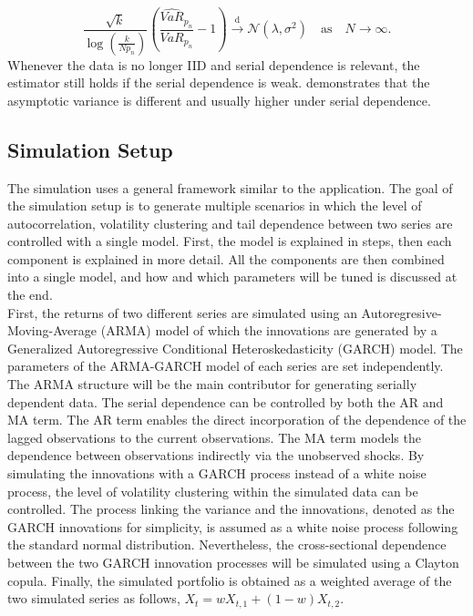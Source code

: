 \documentclass[a4paper,12pt]{article}
\theoremstyle{plain}
\begin{document}
\begin{equation}
    \frac{\sqrt{k}}{\log{\left(\frac{k}{Np_n}\right)}}\left(\frac{\widehat{VaR}_{p_n}}{VaR_{p_n}}-1\right)\xrightarrow{\text{d}}\mathcal{N}\left(\lambda, \sigma^2\right) \quad \text{as} \quad N\rightarrow\infty.
\end{equation}
Whenever the data is no longer IID and serial dependence is relevant, the estimator still holds if the serial dependence is weak.  demonstrates that the asymptotic variance is different and usually higher under serial dependence. 

\subsection{Simulation Setup}
The simulation uses a general framework similar to the application. The goal of the simulation setup is to generate multiple scenarios in which the level of autocorrelation, volatility clustering and tail dependence between two series are controlled with a single model. First, the model is explained in steps, then each component is explained in more detail. All the components are then combined into a single model, and how and which parameters will be tuned is discussed at the end.\\

First, the returns of two different series are simulated using an Autoregresive-Moving-Average (ARMA) model of which the innovations are generated by a Generalized Autoregressive Conditional Heteroskedasticity (GARCH) model. The parameters of the ARMA-GARCH model of each series are set independently. The ARMA structure will be the main contributor for generating serially dependent data. The serial dependence can be controlled by both the AR and MA term. The AR term enables the direct incorporation of the dependence of the lagged observations to the current observations. The MA term models the dependence between observations indirectly via the unobserved shocks. By simulating the innovations with a GARCH process instead of a white noise process, the level of volatility clustering within the simulated data can be controlled. The process linking the variance and the innovations, denoted as the GARCH innovations for simplicity, is assumed as a white noise process following the standard normal distribution. Nevertheless, the cross-sectional dependence between the two GARCH innovation processes will be simulated using a Clayton copula. Finally, the simulated portfolio is obtained as a weighted average of the two simulated series as follows, $ X_t = wX_{t,1} + \left(1-w\right)X_{t,2}$.\\
\end{document}
